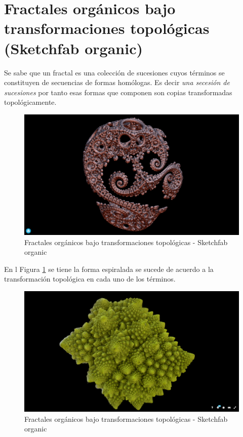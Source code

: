 \documentclass[
  11pt,
]{krantz}
\theoremstyle{definition}
\theoremstyle{definition}
\theoremstyle{definition}
\theoremstyle{definition}
\theoremstyle{remark}
\begin{document}
\hypertarget{fractales-orguxe1nicos-bajo-transformaciones-topoluxf3gicas-sketchfab-organic}{%
\section{Fractales orgánicos bajo transformaciones topológicas (Sketchfab organic)}\label{fractales-orguxe1nicos-bajo-transformaciones-topoluxf3gicas-sketchfab-organic}}

Se sabe que un fractal es una colección de sucesiones cuyos términos se constituyen de secuencias de formas homólogas. Es decir \emph{una secesión de sucesiones} por tanto esas formas que componen son copias transformadas topológicamente.

\begin{figure}[!ht]

{\centering \includegraphics[width=1\linewidth]{Sketch} 

}

\caption{Fractales orgánicos bajo transformaciones topológicas - Sketchfab organic}\label{fig:Sketch}
\end{figure}

En l Figura \ref{fig:Sketch} se tiene la forma espiralada se sucede de acuerdo a la transformación topológica en cada uno de los términos.

\begin{figure}[!ht]

{\centering \includegraphics[width=1\linewidth]{Sketch2} 

}

\caption{Fractales orgánicos bajo transformaciones topológicas - Sketchfab organic}\label{fig:Sketch2}
\end{figure}
\end{document}
